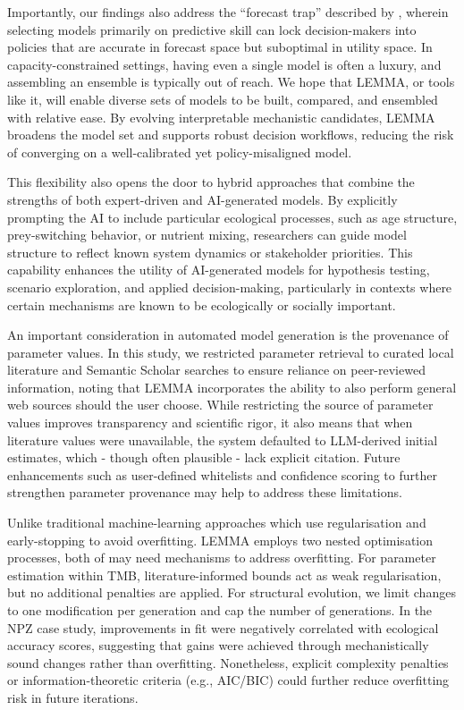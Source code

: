 Importantly, our findings also address the “forecast trap” described by \citep{Boettiger2022}, wherein selecting models primarily on predictive skill can lock decision-makers into policies that are accurate in forecast space but suboptimal in utility space. In capacity-constrained settings, having even a single model is often a luxury, and assembling an ensemble is typically out of reach. We hope that LEMMA, or tools like it, will enable diverse sets of models to be built, compared, and ensembled with relative ease. By evolving interpretable mechanistic candidates, LEMMA broadens the model set and supports robust decision workflows, reducing the risk of converging on a well-calibrated yet policy-misaligned model.

This flexibility also opens the door to hybrid approaches that combine the strengths of both expert-driven and AI-generated models. By explicitly prompting the AI to include particular ecological processes, such as age structure, prey-switching behavior, or nutrient mixing, researchers can guide model structure to reflect known system dynamics or stakeholder priorities. This capability enhances the utility of AI-generated models for hypothesis testing, scenario exploration, and applied decision-making, particularly in contexts where certain mechanisms are known to be ecologically or socially important. 

An important consideration in automated model generation is the provenance of parameter values. In this study, we restricted parameter retrieval to curated local literature and Semantic Scholar searches to ensure reliance on peer-reviewed information, noting that LEMMA incorporates the ability to also perform general web sources should the user choose. While restricting the source of parameter values improves transparency and scientific rigor, it also means that when literature values were unavailable, the system defaulted to LLM-derived initial estimates, which - though often plausible - lack explicit citation. Future enhancements such as user-defined whitelists and confidence scoring to further strengthen parameter provenance may help to address these limitations.

Unlike traditional machine-learning approaches which use regularisation and early-stopping to avoid overfitting. LEMMA employs two nested optimisation processes, both of may need mechanisms to address overfitting. For parameter estimation within TMB, literature-informed bounds act as weak regularisation, but no additional penalties are applied. For structural evolution, we limit changes to one modification per generation and cap the number of generations. In the NPZ case study, improvements in fit were negatively correlated with ecological accuracy scores, suggesting that gains were achieved through mechanistically sound changes rather than overfitting. Nonetheless, explicit complexity penalties or information-theoretic criteria (e.g., AIC/BIC) could further reduce overfitting risk in future iterations.

